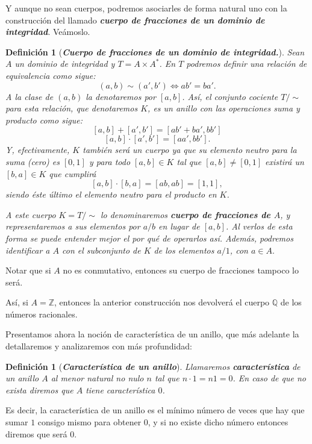 \documentclass[12pt]{article}
\newtheorem{definition}[theorem]{Definición}
\begin{document}
Y aunque no sean cuerpos, podremos asociarles de forma natural uno con la construcción del llamado \textbf{\textit{cuerpo de fracciones de un dominio de integridad}}. Veámoslo.

\begin{definition}[\textbf{\textit{Cuerpo de fracciones de un dominio de integridad.}}] Sean $A$ un dominio de integridad y $T = A \times A^{\ast}$. En $T$ podremos definir una relación de equivalencia como sigue: $$(a,b)\sim (a',b') \Leftrightarrow ab' = ba'.$$ A la clase de $(a,b)$ la denotaremos por $[a,b]$. Así, el conjunto cociente $T/ \sim$ para esta relación, que denotaremos $K$, es un anillo con las operaciones suma y producto como sigue: $$[a,b]+[a',b'] = [ab' + ba', bb']$$
$$[a,b]\cdot[a',b'] = [aa', bb'].$$
Y, efectivamente, $K$ también será un cuerpo ya que su elemento neutro para la suma (cero) es $[0,1]$ y para todo $[a,b] \in K$ tal que $[a,b] \neq [0,1]$ existirá un $[b,a] \in K$ que cumplirá $$[a,b] \cdot [b,a] = [ab, ab] = [1,1],$$ siendo éste último el elemento neutro para el producto en $K$.

A este cuerpo $K = T/\sim$ lo denominaremos \textbf{cuerpo de fracciones de $A$}, y representaremos a sus elementos por $a/b$ en lugar de $[a,b]$. Al verlos de esta forma se puede entender mejor el por qué de operarlos así. Además, podremos identificar a $A$ con el subconjunto de $K$ de los elementos $a/1$, con $a \in A.$
\end{definition}

Notar que si $A$ no es conmutativo, entonces su cuerpo de fracciones tampoco lo será.

Así, si $A = \mathbb{Z}$, entonces la anterior construcción nos devolverá el cuerpo $\mathbb{Q}$ de los números racionales.

Presentamos ahora la noción de característica de un anillo, que más adelante la detallaremos y analizaremos con más profundidad:

\begin{definition}[\textbf{\textit{Característica de un anillo}}]
Llamaremos \textbf{característica} de un anillo $A$ al menor natural no nulo $n$ tal que $n\cdot 1=n1 = 0$. En caso de que no exista diremos que $A$ tiene característica $0$.
\end{definition}

Es decir, la característica de un anillo es el mínimo número de veces que hay que sumar $1$ consigo mismo para obtener $0$, y si no existe dicho número entonces diremos que será $0$.
\end{document}
